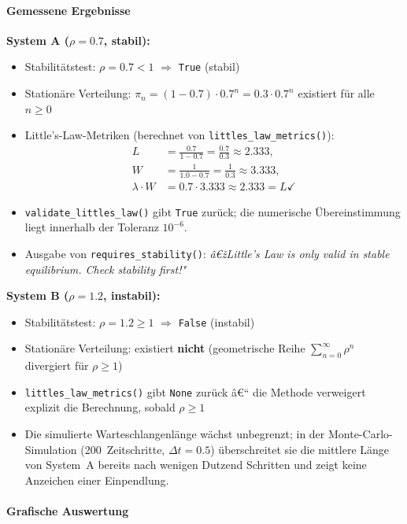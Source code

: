 ﻿\documentclass[a4paper,12pt]{report}
\theoremstyle{definition}
\begin{document}
\paragraph{Gemessene Ergebnisse}

\textbf{System A ($\rho = 0.7$, stabil):}
\begin{itemize}
	\item Stabilitätstest: $\rho = 0.7 < 1$ \quad$\Rightarrow$\quad
	\texttt{True} (stabil)
	\item Stationäre Verteilung: $\pi_n = (1-0.7)\cdot 0.7^n =
	0.3 \cdot 0.7^n$ existiert für alle $n \geq 0$
	\item Little's-Law-Metriken (berechnet von
	\texttt{littles\_law\_metrics()}):
	\begin{align*}
		L &= \frac{0.7}{1-0.7} = \frac{0.7}{0.3} \approx 2.333, \\
		W &= \frac{1}{1.0 - 0.7} = \frac{1}{0.3} \approx 3.333, \\
		\lambda \cdot W &= 0.7 \cdot 3.333 \approx 2.333 = L \checkmark
	\end{align*}
	\item \texttt{validate\_littles\_law()} gibt \texttt{True} zurück;
	die numerische Übereinstimmung liegt innerhalb der Toleranz
	$10^{-6}$.
	\item Ausgabe von \texttt{requires\_stability()}: \emph{â€žLittle's
		Law is only valid in stable equilibrium.  Check stability
		first!"}
\end{itemize}

\textbf{System B ($\rho = 1.2$, instabil):}
\begin{itemize}
	\item Stabilitätstest: $\rho = 1.2 \geq 1$ \quad$\Rightarrow$\quad
	\texttt{False} (instabil)
	\item Stationäre Verteilung: existiert \textbf{nicht} (geometrische
	Reihe $\sum_{n=0}^\infty \rho^n$ divergiert für $\rho \geq 1$)
	\item \texttt{littles\_law\_metrics()} gibt \texttt{None} zurück â€“
	die Methode verweigert explizit die Berechnung, sobald
	$\rho \geq 1$
	\item Die simulierte Warteschlangenlänge wächst unbegrenzt; in
	der Monte-Carlo-Simulation (200~Zeitschritte, $\Delta t = 0.5$)
	überschreitet sie die mittlere Länge von System~A bereits
	nach wenigen Dutzend Schritten und zeigt keine Anzeichen
	einer Einpendlung.
\end{itemize}

\paragraph{Grafische Auswertung}
\end{document}
